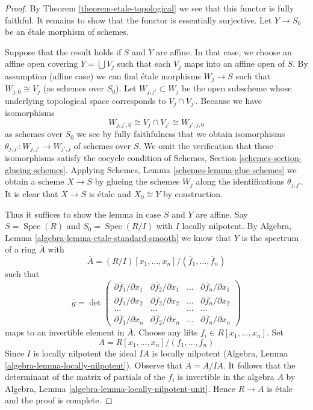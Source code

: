 \documentclass{stacks-project}
\theoremstyle{plain}
\theoremstyle{definition}
\theoremstyle{remark}
\numberwithin{equation}{subsection}
\def\Spec{\mathop{\mathrm{Spec}}}
\begin{document}
\begin{proof}
By Theorem \ref{theorem-etale-topological}
we see that this functor is fully faithful.
It remains to show that the functor is essentially surjective.
Let $Y \to S_0$ be an \'etale morphism of schemes.

\medskip\noindent
Suppose that the result holds if $S$ and $Y$ are affine.
In that case, we choose an affine open covering
$Y = \bigcup V_j$ such that each $V_j$ maps
into an affine open of $S$. By assumption (affine case) we can
find \'etale morphisms $W_j \to S$ such that $W_{j, 0} \cong V_j$
(as schemes over $S_0$). Let $W_{j, j'} \subset W_j$
be the open subscheme whose underlying topological space
corresponds to $V_j \cap V_{j'}$. Because we have isomorphisms
$$
W_{j, j', 0} \cong V_j \cap V_{j'} \cong W_{j', j, 0}
$$
as schemes over $S_0$ we see by fully faithfulness that we
obtain isomorphisms
$\theta_{j, j'} : W_{j, j'} \to W_{j', j}$ of schemes over $S$.
We omit the verification that these isomorphisms satisfy the
cocycle condition of Schemes, Section \ref{schemes-section-glueing-schemes}.
Applying Schemes, Lemma \ref{schemes-lemma-glue-schemes}
we obtain a scheme $X \to S$ by
glueing the schemes $W_j$ along the identifications $\theta_{j, j'}$.
It is clear that $X \to S$ is \'etale and $X_0 \cong Y$ by construction.

\medskip\noindent
Thus it suffices to show the lemma in case $S$ and $Y$ are affine.
Say $S = \Spec(R)$ and $S_0 = \Spec(R/I)$ with $I$ locally nilpotent.
By Algebra, Lemma \ref{algebra-lemma-etale-standard-smooth} we know that
$Y$ is the spectrum of a ring $\overline{A}$ with
$$
\overline{A} = (R/I)[x_1, \ldots, x_n]/(\overline{f}_1, \ldots, \overline{f}_n)
$$
such that
$$
\overline{g} =
\det
\left(
\begin{matrix}
\partial \overline{f}_1/\partial x_1 &
\partial \overline{f}_2/\partial x_1 &
\ldots &
\partial \overline{f}_n/\partial x_1 \\
\partial \overline{f}_1/\partial x_2 &
\partial \overline{f}_2/\partial x_2 &
\ldots &
\partial \overline{f}_n/\partial x_2 \\
\ldots & \ldots & \ldots & \ldots \\
\partial \overline{f}_1/\partial x_n &
\partial \overline{f}_2/\partial x_n &
\ldots &
\partial \overline{f}_n/\partial x_n
\end{matrix}
\right)
$$
maps to an invertible element in $\overline{A}$. Choose any lifts
$f_i \in R[x_1, \ldots, x_n]$. Set
$$
A = R[x_1, \ldots, x_n]/(f_1, \ldots, f_n)
$$
Since $I$ is locally nilpotent the ideal $IA$ is locally nilpotent
(Algebra, Lemma \ref{algebra-lemma-locally-nilpotent}).
Observe that $\overline{A} = A/IA$.
It follows that the determinant of the matrix of partials of the
$f_i$ is invertible in the algebra $A$ by
Algebra, Lemma \ref{algebra-lemma-locally-nilpotent-unit}.
Hence $R \to A$ is \'etale and the proof is complete.
\end{proof}
\end{document}
